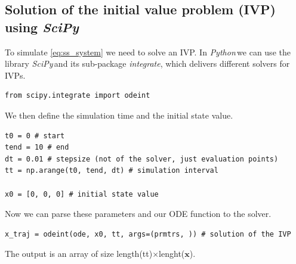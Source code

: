 \documentclass{article}
\newcommand{\py}{\emph{Python}\,}
\newcommand{\scipy}{\emph{SciPy}\,}
\begin{document}
\subsection{Solution of the initial value problem (IVP) using \scipy}
To simulate \eqref{eq:ss_system} we need to solve an IVP. In \py we can use the library \scipy and its sub-package \emph{integrate}, which delivers different solvers for IVPs.
\begin{lstlisting}
from scipy.integrate import odeint
\end{lstlisting}
We then define the simulation time and the initial state value.
\begin{lstlisting}
t0 = 0 # start 
tend = 10 # end
dt = 0.01 # stepsize (not of the solver, just evaluation points)
tt = np.arange(t0, tend, dt) # simulation interval

x0 = [0, 0, 0] # initial state value
\end{lstlisting}
Now we can parse these parameters and our ODE function to the solver.
\begin{lstlisting}
x_traj = odeint(ode, x0, tt, args=(prmtrs, )) # solution of the IVP
\end{lstlisting}
The output is an array of size length(tt)$\times$lenght($\mathbf{x}$).
\end{document}
